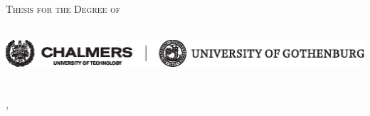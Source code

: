 
\begin{titlepage}
  \centering

  {\scshape Thesis for the Degree of \licdegree}\\[2cm]
%
  {\Huge \lictitle}\\[0.3cm]
%
  {\LARGE\scshape \licauthor}

  \vfill

  \includegraphics[width=\textwidth]{img/LO_CH+GUeng_SV.eps}\\[0.5cm]

\licdepartment\\
\textsc{\licuniversity}\\
\liccity, \liccountry ~\licyear

\end{titlepage}
